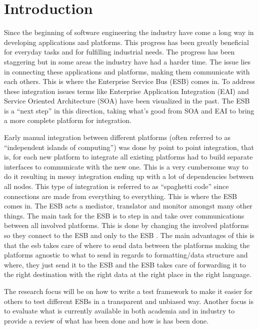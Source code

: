 \section{Introduction}

Since the beginning of software engineering the industry have come a long way in developing applications and platforms. 
This progress has been greatly beneficial for everyday tasks and for fulfilling industrial needs. 
The progress has been staggering but in some areas the industry have had a harder time. 
The issue lies in connecting these applications and platforms, making them communicate with each others. This is where the Enterprise Service Bus (ESB) \cite{falko07} comes in. 
To address these integration issues terms like Enterprise Application Integration (EAI) \cite{Du2008} and Service Oriented Architecture (SOA) \cite{Abuosba2008} have been visualized in the past. 
The ESB is a ``next step'' in this direction, taking what's good from SOA and EAI to bring a more complete platform for integration.

Early manual integration between different platforms (often referred to as ``independent islands of computing'') was done by point to point integration, that is, for each new platform to integrate all existing platforms had to build separate interfaces to communicate with the new one. 
This is a very cumbersome way to do it resulting in messy integration ending up with a lot of dependencies between all nodes.
This type of integration is referred to as ``spaghetti code'' \cite{spaghetticode} since connections are made from everything to everything. 
This is where the ESB comes in. The ESB acts a mediator, translator and monitor amongst many other things. The main task for the ESB is to step in and take over communications between all involved platforms. 
This is done by changing the involved platforms so they connect to the ESB and only to the ESB \cite{Sanjay2011}. 
The main advantages of this is that the esb takes care of where to send data between the platforms making the platforms agnostic to what to send in regards to formatting/data structure and where, they just send it to the ESB and the ESB takes care of forwarding it to the right destination with the right data at the right place in the right language.

The research focus will be on how to write a test framework to make it easier for others to test different ESBs in a transparent and unbiased way. 
Another focus is to evaluate what is currently available in both academia and in industry to provide a review of what has been done and how is has been done.

